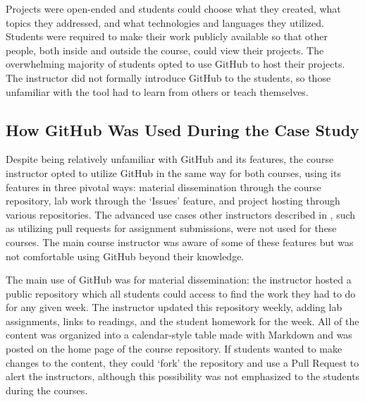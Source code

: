 Projects were open-ended and students could choose what they created, what topics they addressed, and what technologies and languages they utilized. Students were required to make their work publicly available so that other people, both inside and outside the course, could view their projects. The overwhelming majority of students opted to use GitHub to host their projects. The instructor did not formally introduce GitHub to the students, so those unfamiliar with the tool had to learn from others or teach themselves.

\subsection{How GitHub Was Used During the Case Study}
Despite being relatively unfamiliar with GitHub and its features, the course instructor opted to utilize GitHub in the same way for both courses, using its features in three pivotal ways: material dissemination through the course repository, lab work through the `Issues' feature, and project hosting through various repositories. The advanced use cases other instructors described in \cite{zagalsky2015emergence}, such as utilizing pull requests for assignment submissions, were not used for these courses. The main course instructor was aware of some of these features but was not comfortable using GitHub beyond their knowledge.

The main use of GitHub was for material dissemination: the instructor hosted a public repository which all students could access to find the work they had to do for any given week. The instructor updated this repository weekly, adding lab assignments, links to readings, and the student homework for the week. All of the content was organized into a calendar-style table made with Markdown and was posted on the home page of the course repository. If students wanted to make changes to the content, they could `fork' the repository and use a Pull Request to alert the instructors, although this possibility was not emphasized to the students during the courses.


